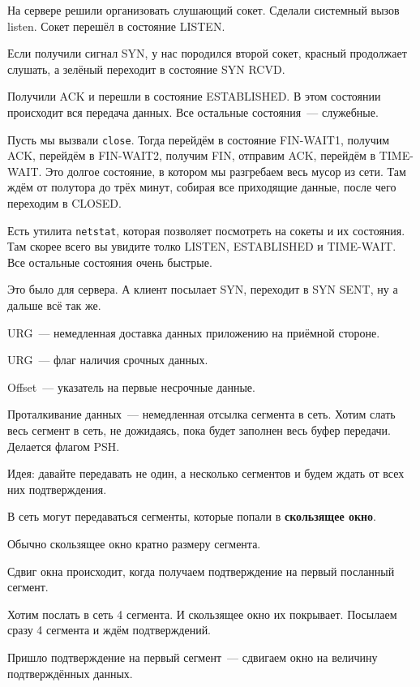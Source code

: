 На сервере решили организовать слушающий сокет. Сделали системный вызов listen. Сокет перешёл в состояние LISTEN.

Если получили сигнал SYN, у нас породился второй сокет, красный продолжает слушать, а зелёный переходит в состояние SYN RCVD.

Получили ACK и перешли в состояние ESTABLISHED. В этом состоянии происходит вся передача данных. Все остальные состояния~--- служебные.

Пусть мы вызвали {\tt close}. Тогда перейдём в состояние FIN-WAIT1, получим ACK, перейдём в FIN-WAIT2, получим FIN, отправим ACK, перейдём в TIME-WAIT. Это долгое состояние, в котором мы разгребаем весь мусор из сети. Там ждём от полутора до трёх минут, собирая все приходящие данные, после чего переходим в CLOSED.

Есть утилита {\tt netstat}, которая позволяет посмотреть на сокеты и их состояния. Там скорее всего вы увидите толко LISTEN, ESTABLISHED и TIME-WAIT. Все остальные состояния очень быстрые.

Это было для сервера. А клиент посылает SYN, переходит в SYN SENT, ну а дальше всё так же.


URG~--- немедленная доставка данных приложению на приёмной стороне.

URG~--- флаг наличия срочных данных.

Offset~--- указатель на первые несрочные данные.

Проталкивание данных~--- немедленная отсылка сегмента в сеть.  Хотим слать весь сегмент в сеть, не дожидаясь, пока будет заполнен весь буфер передачи. Делается флагом PSH.


Идея: давайте передавать не один, а несколько сегментов и будем ждать от всех них подтверждения.

В сеть могут передаваться сегменты, которые попали в {\bf скользящее окно}.

Обычно скользящее окно кратно размеру сегмента.

Сдвиг окна происходит, когда получаем подтверждение на первый посланный сегмент.

Хотим послать в сеть 4 сегмента. И скользящее окно их покрывает. Посылаем сразу 4 сегмента и ждём подтверждений. 

Пришло подтверждение на первый сегмент~--- сдвигаем окно на величину подтверждённых данных.

